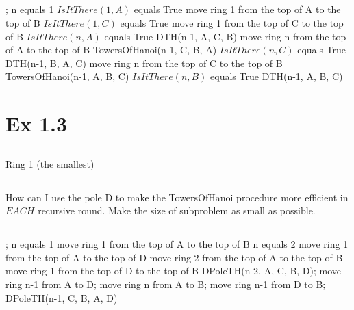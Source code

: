 \subsection{}
\noindent
\Prog\qq     %
; \qq  %
\If n equals 1 \Then \qq
\If $IsItThere(1, A)$ equals True \Then\qq
move ring 1 from the top of A to the top of B\qq
\Elseif $IsItThere(1, C)$ equals True \Then\qq
move ring 1 from the top of C to the top of B\qq
\Endif\qq
%
\Else\qq
\If $IsItThere(n, A)$ equals True \Then\qq
DTH(n-1, A, C, B)\qq
move ring n from the top of A to the top of B\qq
TowersOfHanoi(n-1, C, B, A)\qq
\Elseif $IsItThere(n, C)$ equals True \Then\qq
DTH(n-1, B, A, C)\qq
move ring n from the top of C to the top of B\qq
TowersOfHanoi(n-1, A, B, C)\qq
\Elseif $IsItThere(n, B)$ equals True \Then\qq
DTH(n-1, A, B, C)\qq
\Endif\qq
\Endif\qq
\Fini %


\section{Ex 1.3}

\subsection{}
Ring 1 (the smallest)

\subsection{}
How can I use the pole D to make the TowersOfHanoi  procedure more efficient in $EACH$ recursive round. Make the size of subproblem as small as possible.

\subsection{}
\Prog\qq     %
; \qq 
\If n equals 1 \Then\qq
move ring 1 from the top of A to the top of B\qq
\Elseif n equals 2 \Then\qq
move ring 1 from the top of A to the top of D\qq
move ring 2 from the top of A to the top of B\qq
move ring 1 from the top of D to the top of B\qq
\Else\qq
DPoleTH(n-2, A, C, B, D);\qq
move ring n-1 from A to D;\qq
move ring n from A to B;\qq
move ring n-1 from D to B;\qq
DPoleTH(n-1, C, B, A, D)\qq
\Endif\qq
\Fini 

